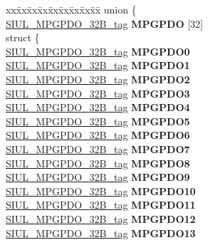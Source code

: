 \begin{DoxyCompactItemize}
\begin{tabbing}
\end{tabbing}\item 
\mbox{\label{structSIU__tag_a2a3400caa44f489afcea19bd242d5f96}} 
\begin{tabbing}
xx\=xx\=xx\=xx\=xx\=xx\=xx\=xx\=xx\=\kill
union \{\\
\>\mbox{\hyperlink{unionSIUL__MPGPDO__32B__tag}{SIUL\_MPGPDO\_32B\_tag}} {\bfseries MPGPDO} \mbox{[}32\mbox{]}\\
\mbox{\label{unionSIU__tag_1_1_0D1550_a960735b616f0003b2b01265a619e7828}} 
\>struct \{\\
\>\>\mbox{\hyperlink{unionSIUL__MPGPDO__32B__tag}{SIUL\_MPGPDO\_32B\_tag}} {\bfseries MPGPDO0}\\
\>\>\mbox{\hyperlink{unionSIUL__MPGPDO__32B__tag}{SIUL\_MPGPDO\_32B\_tag}} {\bfseries MPGPDO1}\\
\>\>\mbox{\hyperlink{unionSIUL__MPGPDO__32B__tag}{SIUL\_MPGPDO\_32B\_tag}} {\bfseries MPGPDO2}\\
\>\>\mbox{\hyperlink{unionSIUL__MPGPDO__32B__tag}{SIUL\_MPGPDO\_32B\_tag}} {\bfseries MPGPDO3}\\
\>\>\mbox{\hyperlink{unionSIUL__MPGPDO__32B__tag}{SIUL\_MPGPDO\_32B\_tag}} {\bfseries MPGPDO4}\\
\>\>\mbox{\hyperlink{unionSIUL__MPGPDO__32B__tag}{SIUL\_MPGPDO\_32B\_tag}} {\bfseries MPGPDO5}\\
\>\>\mbox{\hyperlink{unionSIUL__MPGPDO__32B__tag}{SIUL\_MPGPDO\_32B\_tag}} {\bfseries MPGPDO6}\\
\>\>\mbox{\hyperlink{unionSIUL__MPGPDO__32B__tag}{SIUL\_MPGPDO\_32B\_tag}} {\bfseries MPGPDO7}\\
\>\>\mbox{\hyperlink{unionSIUL__MPGPDO__32B__tag}{SIUL\_MPGPDO\_32B\_tag}} {\bfseries MPGPDO8}\\
\>\>\mbox{\hyperlink{unionSIUL__MPGPDO__32B__tag}{SIUL\_MPGPDO\_32B\_tag}} {\bfseries MPGPDO9}\\
\>\>\mbox{\hyperlink{unionSIUL__MPGPDO__32B__tag}{SIUL\_MPGPDO\_32B\_tag}} {\bfseries MPGPDO10}\\
\>\>\mbox{\hyperlink{unionSIUL__MPGPDO__32B__tag}{SIUL\_MPGPDO\_32B\_tag}} {\bfseries MPGPDO11}\\
\>\>\mbox{\hyperlink{unionSIUL__MPGPDO__32B__tag}{SIUL\_MPGPDO\_32B\_tag}} {\bfseries MPGPDO12}\\
\>\>\mbox{\hyperlink{unionSIUL__MPGPDO__32B__tag}{SIUL\_MPGPDO\_32B\_tag}} {\bfseries MPGPDO13}\\

\end{tabbing}
\end{DoxyCompactItemize}
